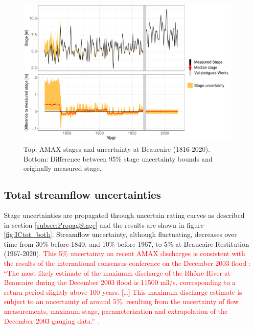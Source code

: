 \documentclass[11pt]{article}
\begin{document}
    \begin{figure}[h!]
        \centering
        \includegraphics[width=0.9\linewidth]{Figs/8-StageErrorAMAX_BOTH.pdf}\hfill
        \caption{Top: AMAX stages and uncertainty at Beaucaire (1816-2020). Bottom: Difference between 95\% stage uncertainty bounds and originally measured stage.}
        \label{fig:StageErrAMAX}
    \end{figure}
  \FloatBarrier

    \subsection{Total streamflow uncertainties}
    
    Stage uncertainties are propagated through uncertain rating curves as described in section \ref{subsec:PropagStage} and the results are shown in figure \ref{fig:ICtot_both}. Streamflow uncertainty, although fluctuating, decreases over time from 30\% before 1840, and 10\% before 1967, to 5\% at Beaucaire Restitution (1967-2020). \textcolor{red}{This 5\% uncertainty on recent AMAX discharges is consistent with the results of the international consensus conference on the December 2003 flood : “The most likely estimate of the maximum discharge of the Rhône River at Beaucaire during the December 2003 flood is 11500 m3/s, corresponding to a return period slightly above 100 years. […] This maximum discharge estimate is subject to an uncertainty of around 5\%, resulting from the uncertainty of flow measurements, maximum stage, parameterization and extrapolation of the December 2003 gauging data.” \citep{medd_debit_2005}.}
        
\end{document}
